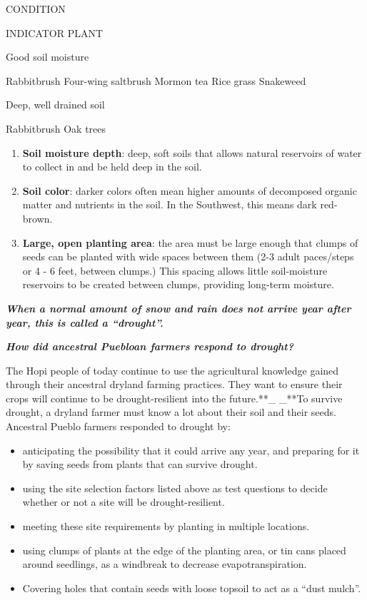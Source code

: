 \documentclass[12pt,]{article}
\providecommand{\tightlist}{%
  \setlength{\itemsep}{0pt}\setlength{\parskip}{0pt}}
\begin{document}
CONDITION

INDICATOR PLANT

Good soil moisture

Rabbitbrush
Four-wing saltbrush
Mormon tea
Rice grass
Snakeweed

Deep, well drained soil

Rabbitbrush
Oak trees

\begin{enumerate}
\def\labelenumi{\arabic{enumi}.}
\tightlist
\item
  \textbf{Soil moisture depth}: deep, soft soils that allows natural reservoirs of water to collect in and be held deep in the soil.
\item
  \textbf{Soil color}: darker colors often mean higher amounts of decomposed organic matter and nutrients in the soil. In the Southwest, this means dark red-brown.
\item
  \textbf{Large, open planting area}: the area must be large enough that clumps of seeds can be planted with wide spaces between them (2-3 adult paces/steps or 4 - 6 feet, between clumps.) This spacing allows little soil-moisture reservoirs to be created between clumps, providing long-term moisture.
\end{enumerate}

\textbf{\emph{When a normal amount of snow and rain does not arrive year after year, this is called a ``drought''.}}

\textbf{\emph{How did ancestral Puebloan farmers respond to drought?}}

The Hopi people of today continue to use the agricultural knowledge gained through their ancestral dryland farming practices. They want to ensure their crops will continue to be drought-resilient into the future.**\_ \_**To survive drought, a dryland farmer must know a lot about their soil and their seeds. Ancestral Pueblo farmers responded to drought by:

\begin{itemize}
\tightlist
\item
  anticipating the possibility that it could arrive any year, and preparing for it by saving seeds from plants that can survive drought.
\item
  using the site selection factors listed above as test questions to decide whether or not a site will be drought-resilient.
\item
  meeting these site requirements by planting in multiple locations.
\item
  using clumps of plants at the edge of the planting area, or tin cans placed around seedlings, as a windbreak to decrease evapotranspiration.
\item
  Covering holes that contain seeds with loose topsoil to act as a ``dust mulch''.
\end{itemize}
\end{document}
